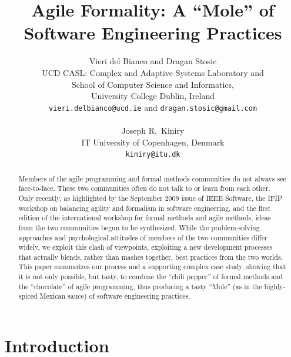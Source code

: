 \documentclass{article}
\begin{document}
\title{Agile Formality: A ``Mole'' of Software Engineering Practices}

\author{Vieri del Bianco and Dragan Stosic\\
  UCD CASL: Complex and Adaptive Systems Laboratory and\\
  School of Computer Science and Informatics,\\
  University College Dublin, Ireland\\
  \texttt{vieri.delbianco@ucd.ie} and \texttt{dragan.stosic@gmail.com}\\
  \\
  Joseph R.~Kiniry \\
  IT University of Copenhagen, Denmark\\
  \texttt{kiniry@itu.dk}
}

\maketitle

\begin{abstract}

Members of the agile programming and formal methods communities do not always see face-to-face.  
These two communities often do not talk to or learn from each other.  
Only recently, as highlighted by the September 2009 issue of IEEE Software, the IFIP workshop on balancing agility and formalism in software engineering, and the first edition of the international workshop for formal methods and agile methods, ideas from the two communities begun to be synthesized.  
While the problem-solving approaches and psychological attitudes of members of the two communities differ widely, we exploit this clash of viewpoints, exploiting a new development processes that actually blends, rather than mashes together, best practices from the two worlds.  
This paper summarizes our process and a supporting complex case study, showing that it is not only possible, but tasty, to combine the ``chili pepper'' of formal methods and the ``chocolate'' of agile programming, thus producing a tasty ``Mole'' (as in the highly-spiced Mexican sauce) of software engineering practices.

\end{abstract}

\section{Introduction}
\label{sec:introduction}
\end{document}

